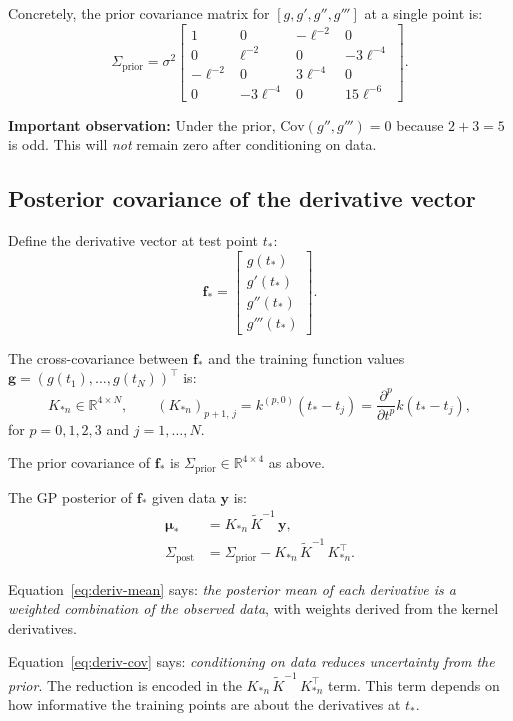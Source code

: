 \documentclass[11pt]{article}
\begin{document}
Concretely, the prior covariance matrix for $[g, g', g'', g''']$ at a single point is:
\[
\Sigma_{\mathrm{prior}} =
\sigma^2
\begin{bmatrix}
1 & 0 & -\ell^{-2} & 0 \\[4pt]
0 & \ell^{-2} & 0 & -3\ell^{-4} \\[4pt]
-\ell^{-2} & 0 & 3\ell^{-4} & 0 \\[4pt]
0 & -3\ell^{-4} & 0 & 15\ell^{-6}
\end{bmatrix}.
\]

\textbf{Important observation:} Under the prior, $\mathrm{Cov}(g'', g''') = 0$ because $2 + 3 = 5$ is odd.
This will \emph{not} remain zero after conditioning on data.

\subsection{Posterior covariance of the derivative vector}

Define the derivative vector at test point $t_*$:
\[
\mathbf{f}_* = \begin{bmatrix} g(t_*) \\ g'(t_*) \\ g''(t_*) \\ g'''(t_*) \end{bmatrix}.
\]

The cross-covariance between $\mathbf{f}_*$ and the training function values $\mathbf{g} = (g(t_1), \dots, g(t_N))^\top$ is:
\[
K_{*n} \in \mathbb{R}^{4 \times N}, \qquad
(K_{*n})_{p+1,\, j} = k^{(p,0)}(t_* - t_j) = \frac{\partial^p}{\partial t^p} k(t_* - t_j),
\]
for $p = 0, 1, 2, 3$ and $j = 1, \dots, N$.

The prior covariance of $\mathbf{f}_*$ is $\Sigma_{\mathrm{prior}} \in \mathbb{R}^{4\times 4}$ as above.

The GP posterior of $\mathbf{f}_*$ given data $\mathbf{y}$ is:
\begin{align}
\boldsymbol{\mu}_* &= K_{*n}\, \tilde{K}^{-1}\, \mathbf{y},
\label{eq:deriv-mean} \\
\Sigma_{\mathrm{post}} &= \Sigma_{\mathrm{prior}} - K_{*n}\, \tilde{K}^{-1}\, K_{*n}^\top.
\label{eq:deriv-cov}
\end{align}

Equation~\eqref{eq:deriv-mean} says: \emph{the posterior mean of each derivative is a weighted combination of the observed data}, with weights derived from the kernel derivatives.

Equation~\eqref{eq:deriv-cov} says: \emph{conditioning on data reduces uncertainty from the prior}. The reduction is encoded in the $K_{*n}\, \tilde{K}^{-1}\, K_{*n}^\top$ term. This term depends on how informative the training points are about the derivatives at $t_*$.
\end{document}
